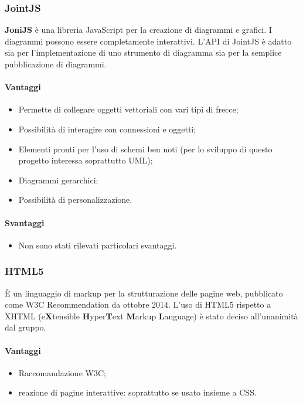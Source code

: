 	\subsubsection{JointJS}
	\textbf{JoniJS} è una libreria JavaScript per la creazione di diagrammi e grafici. I diagrammi possono essere completamente interattivi. L'API di JointJS è adatto sia per l'implementazione di uno strumento di diagramma sia per la semplice pubblicazione di diagrammi.

\paragraph{Vantaggi}
\begin{itemize}
\item Permette di collegare oggetti vettoriali con vari tipi di frecce;
\item Possibilità di interagire con connessioni e oggetti;
\item Elementi pronti per l'uso di schemi ben noti (per lo sviluppo di questo progetto interessa soprattutto UML);
\item Diagrammi gerarchici;
\item Possibilità di personalizzazione.
\end{itemize}

\paragraph{Svantaggi}
\begin{itemize}
\item Non sono stati rilevati particolari svantaggi.
\end{itemize}

\subsubsection{HTML5}
È un linguaggio di markup per la strutturazione delle pagine web, pubblicato come W3C Recommendation da ottobre 2014. L’uso di HTML5 rispetto a XHTML
(e\textbf{X}tensible \textbf{H}yper\textbf{T}ext \textbf{M}arkup \textbf{L}anguage) è stato deciso all'unanimità dal gruppo.

\paragraph{Vantaggi}
\begin{itemize}
\item Raccomandazione W3C;
\item reazione di pagine interattive: soprattutto se usato insieme a CSS.
\end{itemize}

